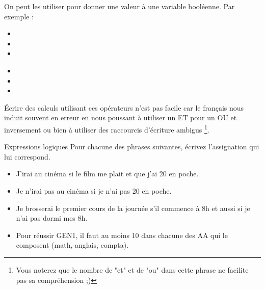 			On peut les utiliser 
			pour donner une valeur à une variable booléenne.
			Par exemple :
			
			\begin{minipage}{7cm}
				\begin{itemize}
					\item {}
					\item {}
					\item {}
				\end{itemize}
			\end{minipage}
			\begin{minipage}{7cm}
				\begin{itemize}
					\item {}
					\item {}
					\item {}
				\end{itemize}
			\end{minipage}
	
			Écrire des calculs utilisant ces opérateurs n'est pas facile
			car le français nous induit souvent en erreur
			en nous poussant à utiliser un ET pour un OU et inversement
			ou bien à utiliser des raccourcis d'écriture ambigus%
			\footnote{%
				Vous noterez que le nombre de "et" et de "ou"
				dans cette phrase ne facilite pas sa compréhension ;)%
			}.
	
			\begin{Exercice}{Expressions logiques}
				Pour chacune des phrases suivantes,
				écrivez l'assignation qui lui correspond.
				\begin{itemize}
				\item J’irai au cinéma si le film me plait et que j’ai 20\texteuro{} en poche.
				\item Je n’irai pas au cinéma si je n’ai pas 20\texteuro{} en poche.
				\item Je brosserai le premier cours de la journée s’il commence à 8h et aussi si je n’ai pas dormi mes 8h.
				\item Pour réussir GEN1, il faut au moins 10 dans chacune des AA qui le composent (math, anglais, compta).	
				\end{itemize}
			\end{Exercice}
	

